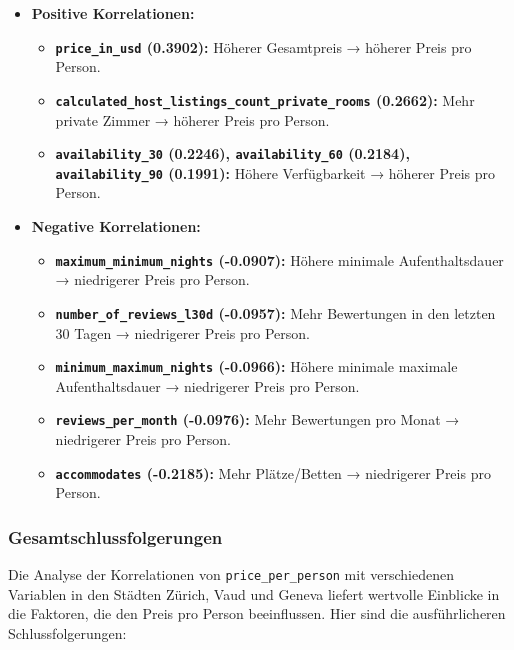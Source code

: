 \documentclass[
  journal,
]{IEEEtran}%
\providecommand{\tightlist}{%
  \setlength{\itemsep}{0pt}\setlength{\parskip}{0pt}}\usepackage{longtable,booktabs,array}
\begin{document}
\begin{itemize}
\item
  \textbf{Positive Korrelationen:}

  \begin{itemize}
  \tightlist
  \item
    \textbf{\texttt{price\_in\_usd} (0.3902):} Höherer Gesamtpreis →
    höherer Preis pro Person.
  \item
    \textbf{\texttt{calculated\_host\_listings\_count\_private\_rooms}
    (0.2662):} Mehr private Zimmer → höherer Preis pro Person.
  \item
    \textbf{\texttt{availability\_30} (0.2246),
    \texttt{availability\_60} (0.2184), \texttt{availability\_90}
    (0.1991):} Höhere Verfügbarkeit → höherer Preis pro Person.
  \end{itemize}
\item
  \textbf{Negative Korrelationen:}

  \begin{itemize}
  \tightlist
  \item
    \textbf{\texttt{maximum\_minimum\_nights} (-0.0907):} Höhere
    minimale Aufenthaltsdauer → niedrigerer Preis pro Person.
  \item
    \textbf{\texttt{number\_of\_reviews\_l30d} (-0.0957):} Mehr
    Bewertungen in den letzten 30 Tagen → niedrigerer Preis pro Person.
  \item
    \textbf{\texttt{minimum\_maximum\_nights} (-0.0966):} Höhere
    minimale maximale Aufenthaltsdauer → niedrigerer Preis pro Person.
  \item
    \textbf{\texttt{reviews\_per\_month} (-0.0976):} Mehr Bewertungen
    pro Monat → niedrigerer Preis pro Person.
  \item
    \textbf{\texttt{accommodates} (-0.2185):} Mehr Plätze/Betten →
    niedrigerer Preis pro Person.
  \end{itemize}
\end{itemize}

\subsubsection{Gesamtschlussfolgerungen}\label{gesamtschlussfolgerungen}

Die Analyse der Korrelationen von \texttt{price\_per\_person} mit
verschiedenen Variablen in den Städten Zürich, Vaud und Geneva liefert
wertvolle Einblicke in die Faktoren, die den Preis pro Person
beeinflussen. Hier sind die ausführlicheren Schlussfolgerungen:
\end{document}
